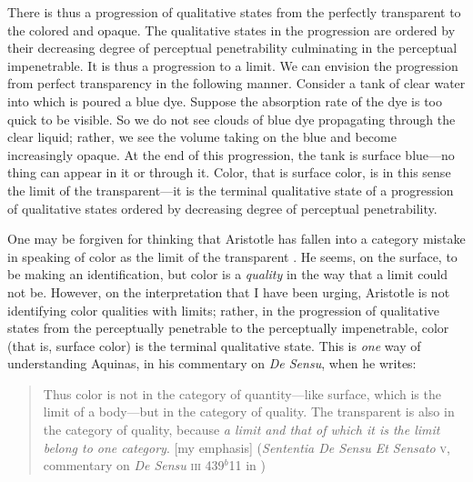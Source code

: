 \documentclass[12pt]{article}
\begin{document}
There is thus a progression of qualitative states from the perfectly transparent to the colored and opaque. The qualitative states in the progression are ordered by their decreasing degree of perceptual penetrability culminating in the perceptual impenetrable. It is thus a progression to a limit. We can envision the progression from perfect transparency in the following manner. Consider a tank of clear water into which is poured a blue dye. Suppose the absorption rate of the dye is too quick to be visible. So we do not see clouds of blue dye propagating through the clear liquid; rather, we see the volume taking on the blue and become increasingly opaque. At the end of this progression, the tank is surface blue---no thing can appear in it or through it. Color, that is surface color, is in this sense the limit of the transparent---it is the terminal qualitative state of a progression of qualitative states ordered by decreasing degree of perceptual penetrability.

One may be forgiven for thinking that Aristotle has fallen into a category mistake in speaking of color as the limit of the transparent \citep[65]{Broackes:1999uq}. He seems, on the surface, to be making an identification, but color is a \emph{quality} in the way that a limit could not be. However, on the interpretation that I have been urging, Aristotle is not identifying color qualities with limits; rather, in the progression of qualitative states from the perceptually penetrable to the perceptually impenetrable, color (that is, surface color) is the terminal qualitative state. This is \emph{one} way of understanding Aquinas, in his commentary on \emph{De Sensu}, when he writes:
\begin{quote}
	Thus color is not in the category of quantity---like surface, which is the limit of a body---but in the category of quality. The transparent is also in the category of quality, because \emph{a limit and that of which it is the limit belong to one category}. [my emphasis] (\emph{Sententia De Sensu Et Sensato} \textsc{v}, commentary on \emph{De Sensu} \textsc{iii} 439\( ^{b} \)11 in \citealt{White:2005vn})
\end{quote}
\end{document}
